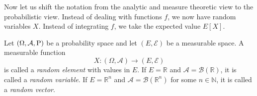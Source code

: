 


Now let us shift the notation from the analytic and measure theoretic view to the probabilistic view. Instead of dealing with functions $f$, we now have random variables $X$. Instead of integrating $f$, we take the expected value \( E[X] \).
\begin{definition}
    Let  \( (\Omega,\mathcal{A}, \mathrm{P}) \) be a probability space and let \( (E,\mathcal{E}) \) be a measurable space. A measurable function 
    \[
        X \colon (\Omega, \mathcal{A}) \to  (E, \mathcal{E})
    \]
    is called a \textit{random element} with values in $E$. If \( E = \mathbb{R} \) and \( \mathcal{A} = \mathcal{B}(\mathbb{R}) \), it is called a \textit{random variable}. If \( E = \mathbb{R}^{n} \) and \( \mathcal{A} = \mathcal{B}(\mathbb{R}^{n}) \) for some \( n \in \mathbb{N} \), it is called a \textit{random vector}.
\end{definition}

